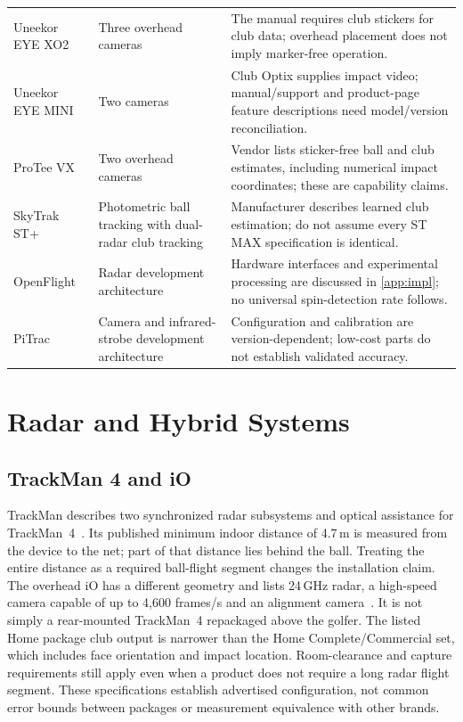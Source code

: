 \begin{longtable}{@{}p{3.0cm}p{5.2cm}p{6.2cm}@{}}
Uneekor EYE XO2 & Three overhead cameras & The manual requires club stickers for club data; overhead placement does not imply marker-free operation. \\
Uneekor EYE MINI & Two cameras & Club Optix supplies impact video; manual/support and product-page feature descriptions need model/version reconciliation. \\
ProTee VX & Two overhead cameras & Vendor lists sticker-free ball and club estimates, including numerical impact coordinates; these are capability claims. \\
SkyTrak ST+ & Photometric ball tracking with dual-radar club tracking & Manufacturer describes learned club estimation; do not assume every ST MAX specification is identical. \\
OpenFlight & Radar development architecture & Hardware interfaces and experimental processing are discussed in \cref{app:impl}; no universal spin-detection rate follows. \\
PiTrac & Camera and infrared-strobe development architecture & Configuration and calibration are version-dependent; low-cost parts do not establish validated accuracy. \\
\end{longtable}
\endgroup

\section{Radar and Hybrid Systems}

\subsection{TrackMan 4 and iO}

TrackMan describes two synchronized radar subsystems and optical assistance for TrackMan~4~\cite{trackmanspecs,trackmanoert}.
Its published minimum indoor distance of 4.7\,m is measured from the device to the net; part of that distance lies behind the ball.
Treating the entire distance as a required ball-flight segment changes the installation claim.
The overhead iO has a different geometry and lists 24\,GHz radar, a high-speed camera capable of up to 4,600 frames/s and an alignment camera~\cite{trackmanspecs}.
It is not simply a rear-mounted TrackMan~4 repackaged above the golfer.
The listed Home package club output is narrower than the Home Complete/Commercial set, which includes face orientation and impact location.
Room-clearance and capture requirements still apply even when a product does not require a long radar flight segment.
These specifications establish advertised configuration, not common error bounds between packages or measurement equivalence with other brands.

